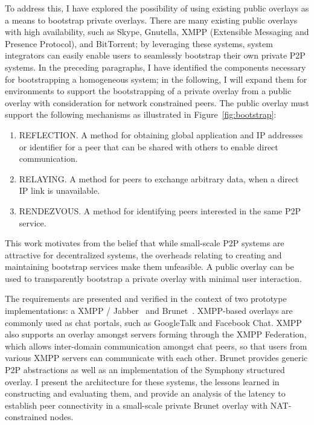 To address this, I have explored the possibility of using existing public
overlays as a means to bootstrap private overlays.  There are many existing
public overlays with high availability, such as Skype, Gnutella, XMPP
(Extensible Messaging and Presence Protocol), and BitTorrent; by leveraging
these systems, system integrators can easily enable users to seamlessly
bootstrap their own private P2P systems.  In the preceding paragraphs, I have
identified the components necessary for bootstrapping a homogeneous system; in
the following, I will expand them for environments to support the bootstrapping
of a private overlay from a public overlay with consideration for network
constrained peers.  The public overlay must support the following mechanisms as
illustrated in Figure~\ref{fig:bootstrap}:

\begin{enumerate}

\item REFLECTION. A method for obtaining global application and IP addresses or
identifier for a peer that can be shared with others to enable direct
communication.

\item RELAYING. A method for peers to exchange arbitrary data, when a direct IP
link is unavailable.

\item RENDEZVOUS. A method for identifying peers interested in the same P2P
service.

\end{enumerate}

This work motivates from the belief that while small-scale P2P systems are
attractive for decentralized systems, the overheads relating to creating and
maintaining bootstrap services make them unfeasible.  A public overlay can be
used to transparently bootstrap a private overlay with minimal user
interaction.

The requirements are presented and verified in the context of two prototype
implementations: a XMPP / Jabber~\cite{xmpp} and Brunet~\cite{brunet}.
XMPP-based overlays are commonly used as chat portals, such as GoogleTalk and
Facebook Chat.  XMPP also supports an overlay amongst servers forming through
the XMPP Federation, which allows inter-domain communication amongst chat
peers, so that users from various XMPP servers can communicate with each other.
Brunet provides generic P2P abstractions as well as an implementation of the
Symphony structured overlay.  I present the architecture for these systems, the
lessons learned in constructing and evaluating them, and provide an analysis of
the latency to establish peer connectivity in a small-scale private Brunet
overlay with NAT-constrained nodes.

